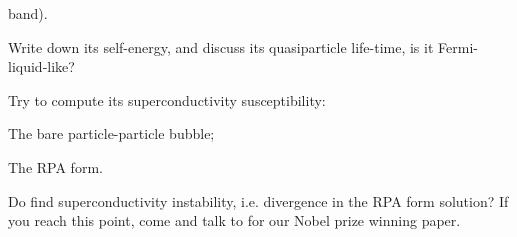 \begin{problem}
\begin{enumext}
\begin{enumext}
      band).
      \begin{enumext}
        \item Write down its self-energy, and discuss its quasiparticle
        life-time, is it Fermi-liquid-like?
        \item Try to compute its superconductivity susceptibility:
        \begin{enumext}
          \item The bare particle-particle bubble;
          \item The RPA form.
        \end{enumext}
        Do find superconductivity instability, i.e. divergence in the RPA form
        solution? If you reach this point, come and talk to for our Nobel prize
        winning paper.
      \end{enumext}
    \end{enumext}
  \end{enumext}
\end{problem}
\endgroup